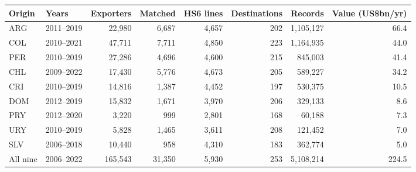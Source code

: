 \begin{tabular}{llrrrrrr}
\toprule
Origin & Years & Exporters & Matched & HS6 lines & Destinations & Records & Value (US\$bn/yr) \\
\midrule
ARG & 2011--2019 & 22,980 & 6,687 & 4,657 & 202 & 1,105,127 & 66.4 \\
COL & 2010--2021 & 47,711 & 7,711 & 4,850 & 223 & 1,164,935 & 44.0 \\
PER & 2010--2019 & 27,286 & 4,696 & 4,600 & 215 & 845,003 & 41.4 \\
CHL & 2009--2022 & 17,430 & 5,776 & 4,673 & 205 & 589,227 & 34.2 \\
CRI & 2010--2019 & 14,816 & 1,387 & 4,452 & 197 & 530,375 & 10.5 \\
DOM & 2012--2019 & 15,832 & 1,671 & 3,970 & 206 & 329,133 & 8.6 \\
PRY & 2012--2020 & 3,220 & 999 & 2,801 & 168 & 60,188 & 7.3 \\
URY & 2010--2019 & 5,828 & 1,465 & 3,611 & 208 & 121,452 & 7.0 \\
SLV & 2006--2018 & 10,440 & 958 & 4,310 & 183 & 362,774 & 5.0 \\
\midrule
All nine & 2006--2022 & 165,543 & 31,350 & 5,930 & 253 & 5,108,214 & 224.5 \\
\bottomrule
\end{tabular}
